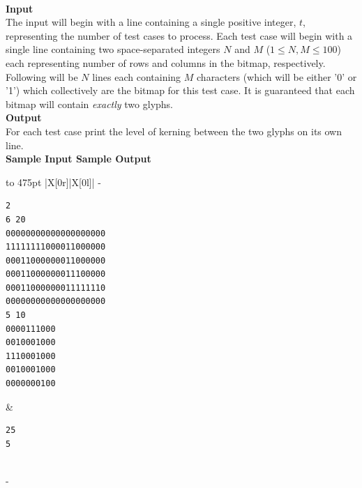 \documentclass[a4paper,11pt]{article}
\begin{document}
\vspace{7mm}\\
\large{\bf{Input}}\vspace{2mm}\\
The input will begin with a line containing a single positive integer, $t$, representing the number of test cases to process. Each test case will begin with a single line containing two space-separated integers $N$ and $M$ ($1 \leq N, M \leq 100$) each representing number of rows and columns in the bitmap, respectively. Following will be $N$ lines each containing $M$ characters (which will be either '0' or '1') which collectively are the bitmap for this test case. It is guaranteed that each bitmap will contain \emph{exactly} two glyphs.
\vspace{3mm}\\
\large{\bf{Output}}\vspace{2mm}\\
For each test case print the level of kerning between the two glyphs on its own line.
\vspace{110mm}\\
\bf{Sample Input} \hspace{52mm} \bf{Sample Output}\vspace{1mm}\\
\begin{tabu*} to 475pt {|X[0r]|X[0l]|}
\tabucline-
\vspace{-\baselineskip} %
\begin{Verbatim}
2
6 20 
00000000000000000000
11111111000011000000
00011000000011000000
00011000000011100000
00011000000011111110
00000000000000000000
5 10
0000111000
0010001000
1110001000
0010001000
0000000100
\end{Verbatim}
&
\vspace{-\baselineskip} %
\begin{Verbatim}
25
5
\end{Verbatim}
\\
\tabucline-
\end{tabu*}
\end{document}
